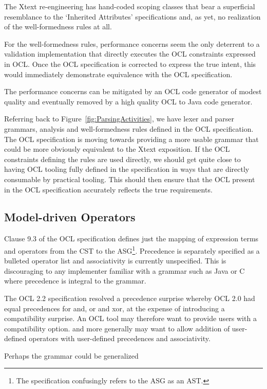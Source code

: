 \documentclass[runningheads,a4paper]{llncs}
\begin{document}
The Xtext re-engineering has hand-coded scoping classes that bear a superficial resemblance to the `Inherited Attributes' specifications and, as yet, no realization of the well-formedness rules at all.

For the well-formedness rules, performance concerns seem the only deterrent to a validation implementation that directly executes the OCL constraints expressed in OCL. Once the OCL specification is corrected to express the true intent, this would immediately demonstrate equivalence with the OCL specification.

The performance concerns can be mitigated by an OCL code generator of modest quality and eventually removed by a high quality OCL to Java code generator.

Referring back to Figure~\ref{fig:ParsingActivities}, we have lexer and parser grammars, analysis and well-formedness rules defined in the OCL specification. The OCL specification is moving towards providing a more usable grammar that could be more obviously equivalent to the Xtext exposition. If the OCL constraints defining the rules are used directly, we should get quite close to having OCL tooling fully defined in the specification in ways that are directly consumable by practical tooling. This should then ensure that the OCL present in the OCL specification accurately reflects the true requirements.

\subsection{Model-driven Operators}

Clause 9.3 of the OCL specification defines just the mapping of expression terms and operators from the CST to the ASG\footnote{The specification confusingly refers to the ASG as an AST.}. Precedence is separately specified as a bulleted operator list and associativity is currently unspecified. This is discouraging to any implementer familiar with a grammar such as Java or C where precedence is integral to the grammar.

The OCL 2.2 specification resolved a precedence surprise whereby OCL 2.0 had equal precedences for and, or and xor, at the expense of introducing a compatibility surprise. An OCL tool may therefore want to provide users with a compatibility option. and more generally may want to allow addition of user-defined operators with user-defined precedences and associativity.

Perhaps the grammar could be generalized
\end{document}
